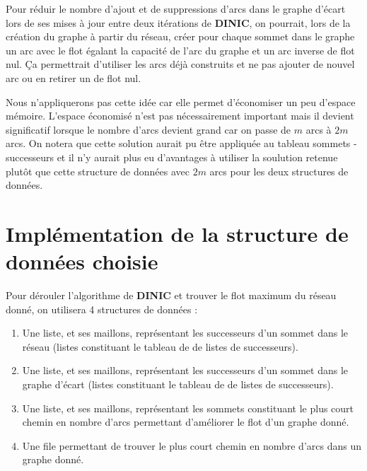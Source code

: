 \documentclass[11pt, a4paper]{report}
\begin{document}
    Pour réduir le nombre d'ajout et de suppressions d'arcs dans le graphe d'écart lors de ses mises à jour entre deux itérations de \textbf{DINIC}, on pourrait, lors de la création du graphe à partir du réseau, créer pour chaque sommet dans le graphe un arc avec le flot égalant la capacité de l'arc du graphe et un arc inverse de flot nul. Ça permettrait d'utiliser les arcs déjà construits et ne pas ajouter de nouvel arc ou en retirer un de flot nul.
    
    Nous n'appliquerons pas cette idée car elle permet d'économiser un peu d'espace mémoire. L'espace économisé n'est pas nécessairement important mais il devient significatif lorsque le nombre d'arcs devient grand car on passe de $m$ arcs à $2m$ arcs. On notera que cette solution aurait pu être appliquée au tableau sommets - successeurs et il n'y aurait plus eu d'avantages à utiliser la soulution retenue plutôt que cette structure de données avec $2m$ arcs pour les deux structures de données.
    
	\section{Implémentation de la structure de données choisie}
	
	Pour dérouler l'algorithme de \textbf{DINIC} et trouver le flot maximum du réseau donné, on utilisera 4 structures de données : 
	\begin{enumerate}
		\item Une liste, et ses maillons, représentant les successeurs d'un sommet dans le réseau (listes constituant le tableau de de listes de successeurs).
		\item Une liste, et ses maillons, représentant les successeurs d'un sommet dans le graphe d'écart (listes constituant le tableau de de listes de successeurs).
		\item Une liste, et ses maillons, représentant les sommets constituant le plus court chemin en nombre d'arcs permettant d'améliorer le flot d'un graphe donné.
		\item Une file permettant de trouver le plus court chemin en nombre d'arcs dans un graphe donné.
	\end{enumerate}
	
\end{document}
